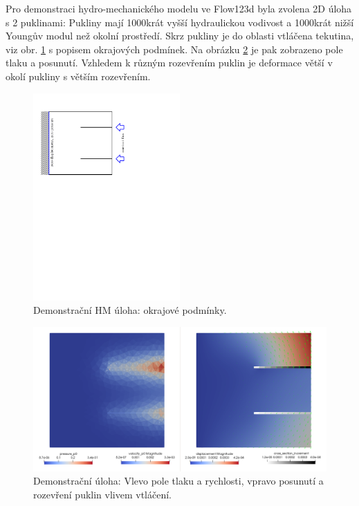 \documentclass[11pt,a4paper]{article}
\begin{document}
\begin{onehalfspacing}
Pro demonstraci hydro-mechanického modelu ve Flow123d byla zvolena 2D úloha s 2 puklinami:
Pukliny mají 1000krát vyšší hydraulickou vodivost a 1000krát nižší Youngův modul než okolní prostředí.
Skrz pukliny je do oblasti vtláčena tekutina, viz obr. \ref{fig:hm_bc} s popisem okrajových podmínek.
Na obrázku \ref{fig:hm_results} je pak zobrazeno pole tlaku a posunutí.
Vzhledem k různým rozevřením puklin je deformace větší v okolí pukliny s větším rozevřením.
\begin{figure}
    \centering
    \includegraphics[width=0.5\textwidth]{graphics/obr_stebel/01_inject_bc.pdf}
    \caption{Demonstrační HM úloha: okrajové podmínky.}
    \label{fig:hm_bc}
\end{figure}

\begin{figure}
    \centering
    \includegraphics[width=\textwidth]{graphics/obr_stebel/01_inject.png}
    \caption{Demonstrační úloha: Vlevo pole tlaku a rychlosti, vpravo posunutí a rozevření puklin vlivem vtláčení.}
    \label{fig:hm_results}
\end{figure}



\end{onehalfspacing}
\end{document}
